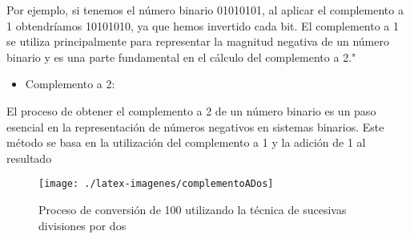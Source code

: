 Por ejemplo, si tenemos el número binario 01010101, al aplicar el complemento a 1 obtendríamos 10101010, ya que hemos invertido cada bit. El complemento a 1 se utiliza principalmente para representar la magnitud negativa de un número binario y es una parte fundamental en el cálculo del complemento a 2."
\newline

\begin{itemize}
    \item Complemento a 2:
\end{itemize}
El proceso de obtener el complemento a 2 de un número binario es un paso esencial en la representación de números negativos en sistemas binarios. Este método se basa en la utilización del complemento a 1 y la adición de 1 al resultado
\newline

\begin{figure}
\centerline{\texttt{[image: ./latex-imagenes/complementoADos]}}
\caption{Proceso de conversión de 100 utilizando la técnica de sucesivas divisiones por dos}
\vspace*{-5pt}
\label{fig:dos}
\end{figure}

